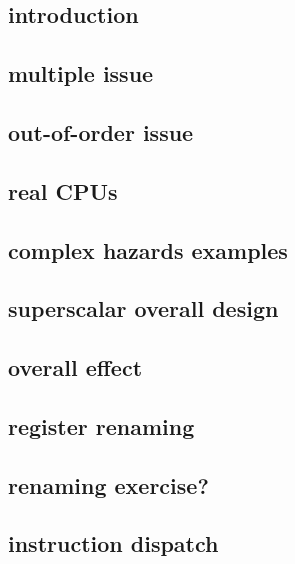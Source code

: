 
\subsection{introduction}

\subsection{multiple issue}


\subsection{out-of-order issue}


\subsection{real CPUs}


\subsection{complex hazards examples}

\subsection{superscalar overall design}


\subsection{overall effect}


\subsection{register renaming}



\subsection{renaming exercise?}


\subsection{instruction dispatch}



